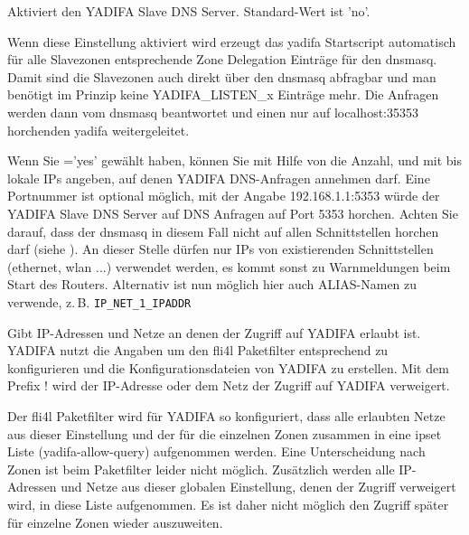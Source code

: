\begin{description}


    Aktiviert den YADIFA Slave DNS Server. Standard-Wert ist 'no'.


    Wenn diese Einstellung aktiviert wird erzeugt das yadifa
    Startscript automatisch für alle Slavezonen entsprechende Zone
    Delegation Einträge für den dnsmasq. Damit sind die Slavezonen
    auch direkt über den dnsmasq abfragbar und man benötigt im
    Prinzip keine YADIFA\_LISTEN\_x Einträge mehr. Die Anfragen werden
    dann vom dnsmasq beantwortet und einen nur auf localhost:35353
    horchenden yadifa weitergeleitet.


    Wenn Sie ='yes' gewählt haben, können Sie mit
    Hilfe von  die Anzahl, und
    mit  bis  lokale IPs
    angeben, auf denen YADIFA DNS-Anfragen annehmen darf. Eine
    Portnummer ist optional möglich, mit der Angabe 192.168.1.1:5353
    würde der YADIFA Slave DNS Server auf DNS Anfragen auf Port 5353
    horchen. Achten Sie darauf, dass der dnsmasq in diesem Fall nicht
    auf allen Schnittstellen horchen darf
    (siehe ).  An dieser Stelle dürfen nur
    IPs von existierenden Schnittstellen (ethernet, wlan ...)
    verwendet werden, es kommt sonst zu Warnmeldungen beim Start des
    Routers. Alternativ ist nun möglich hier auch ALIAS-Namen zu
    verwende, z.\,B. \verb+IP_NET_1_IPADDR+
      

    Gibt IP-Adressen und Netze an denen der Zugriff auf YADIFA erlaubt
    ist. YADIFA nutzt die Angaben um den fli4l Paketfilter
    entsprechend zu konfigurieren und die Konfigurationsdateien von
    YADIFA zu erstellen. Mit dem Prefix ! wird der IP-Adresse oder dem
    Netz der Zugriff auf YADIFA verweigert.

    Der fli4l Paketfilter wird für YADIFA so konfiguriert, dass alle
    erlaubten Netze aus dieser Einstellung und der für die einzelnen
    Zonen zusammen in eine ipset Liste (yadifa-allow-query)
    aufgenommen werden. Eine Unterscheidung nach Zonen ist beim
    Paketfilter leider nicht möglich. Zusätzlich werden alle
    IP-Adressen und Netze aus dieser globalen Einstellung, denen der
    Zugriff verweigert wird, in diese Liste aufgenommen. Es ist daher
    nicht möglich den Zugriff später für einzelne Zonen wieder
    auszuweiten.


\end{description}
